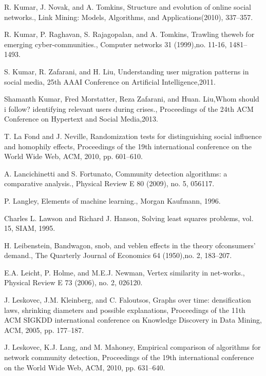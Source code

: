 \begin{thebibliography}{999}
 R. Kumar, J. Novak, and A. Tomkins, Structure and evolution of online social networks., Link Mining: Models, Algorithms, and Applications(2010), 337–357.

 R. Kumar, P. Raghavan, S. Rajagopalan, and A. Tomkins, Trawling theweb for emerging cyber-communities., Computer networks 31 (1999),no. 11-16, 1481–1493.

 S. Kumar, R. Zafarani, and H. Liu, Understanding user migration patterns in social media, 25th AAAI Conference on Artificial Intelligence,2011.

 Shamanth Kumar, Fred Morstatter, Reza Zafarani, and Huan. Liu,Whom should i follow? identifying relevant users during crises., Proceedings of the 24th ACM Conference on Hypertext and Social Media,2013.

 T. La Fond and J. Neville, Randomization tests for distinguishing social influence and homophily effects, Proceedings of the 19th international conference on the World Wide Web, ACM, 2010, pp. 601–610.

 A. Lancichinetti and S. Fortunato, Community detection algorithms: a comparative analysis., Physical Review E 80 (2009), no. 5, 056117.

 P. Langley, Elements of machine learning., Morgan Kaufmann, 1996.

 Charles L. Lawson and Richard J. Hanson, Solving least squares problems, vol. 15, SIAM, 1995.

 H. Leibenstein, Bandwagon, snob, and veblen effects in the theory ofconsumers’ demand., The Quarterly Journal of Economics 64 (1950),no. 2, 183–207.

 E.A. Leicht, P. Holme, and M.E.J. Newman, Vertex similarity in net-works., Physical Review E 73 (2006), no. 2, 026120.

 J. Leskovec, J.M. Kleinberg, and C. Faloutsos, Graphs over time: densification laws, shrinking diameters and possible explanations, Proceedings of the 11th ACM SIGKDD international conference on Knowledge Discovery in Data Mining, ACM, 2005, pp. 177–187.

 J. Leskovec, K.J. Lang, and M. Mahoney, Empirical comparison of algorithms for network community detection, Proceedings of the 19th international conference on the World Wide Web, ACM, 2010, pp. 631–640.


\end{thebibliography}
